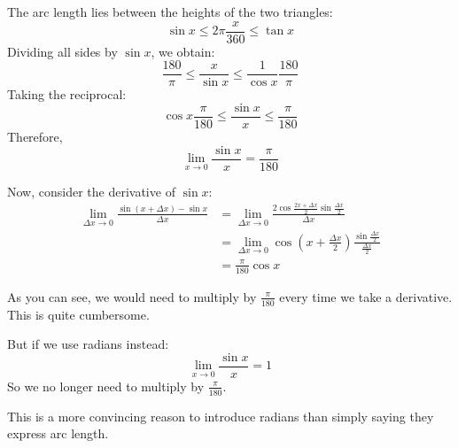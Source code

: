 \documentclass[letterpaper, 12pt]{article}
\theoremstyle{custom}
\begin{document}
The arc length lies between the heights of the two triangles:
\begin{equation*}
  \sin x \leq 2 \pi \frac{x}{360} \leq \tan x
\end{equation*}
Dividing all sides by $\sin x$, we obtain:
\begin{equation*}
   \frac{180}{\pi} \leq \frac{x}{\sin x} \leq \frac{1}{\cos x}\frac{180}{\pi}
\end{equation*}
Taking the reciprocal:
\begin{equation*}
  \cos x \frac{\pi}{180} \leq \frac{\sin x}{x} \leq \frac{\pi}{180}
\end{equation*}
Therefore,
\begin{equation*}
  \lim_{x \rightarrow 0} \frac{\sin x}{x} = \frac{\pi}{180}
\end{equation*}

Now, consider the derivative of $\sin x$:
\begin{align*}
  \lim_{\Delta x \rightarrow 0} \frac{\sin (x+\Delta x) - \sin x}{\Delta x}
  &= \lim_{\Delta x \rightarrow 0} \frac{2 \cos \frac{2x+\Delta x}{2}\sin \frac{\Delta x}{2}}{\Delta x} \\
  &= \lim_{\Delta x \rightarrow 0} \cos \left( x+\frac{\Delta x}{2} \right) \frac{\sin \frac{\Delta x}{2}}{\frac{\Delta x}{2}} \\
  &= \frac{\pi}{180} \cos x
\end{align*}

As you can see, we would need to multiply by $\displaystyle \frac{\pi}{180}$ every time we take a derivative.  
This is quite cumbersome.

But if we use radians instead:
\begin{equation*}
  \lim_{x \rightarrow 0} \frac{\sin x}{x} = 1
\end{equation*}
So we no longer need to multiply by $\displaystyle \frac{\pi}{180}$.

This is a more convincing reason to introduce radians than simply saying they express arc length.
\end{document}
